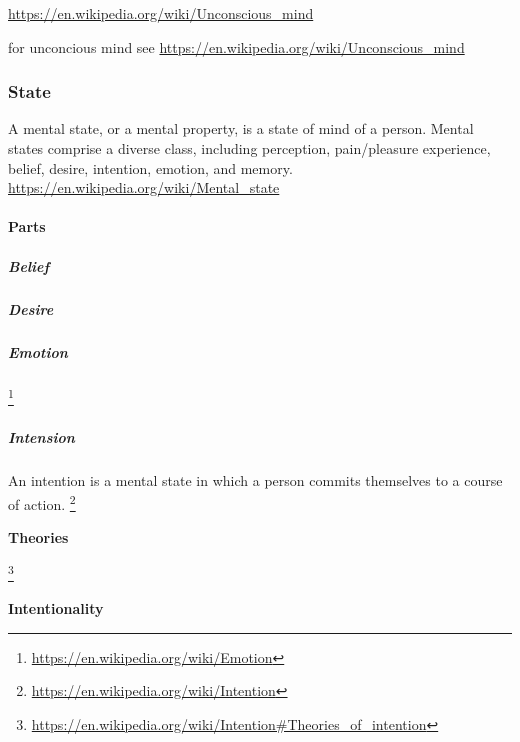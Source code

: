 \documentclass{book}
\providecommand{\ProjectDeepHeading}[2]{%
    \par\medskip\noindent\textbf{#2}\par\smallskip
}
\providecommand{\seeherefooter}[1]{\footnote{\url{#1}}}
\begin{document}
\url{https://en.wikipedia.org/wiki/Unconscious_mind}
    
    for unconcious mind see
    \url{https://en.wikipedia.org/wiki/Unconscious_mind}

\subsubsection{State}


A mental state, or a mental property, is a state of mind of a person. Mental states comprise a diverse class, including perception, pain/pleasure experience, belief, desire, intention, emotion, and memory.
    \url{https://en.wikipedia.org/wiki/Mental_state}
    
    

\paragraph{Parts}

\subparagraph{Belief}


%

\subparagraph{Desire}


%

\subparagraph{Emotion}


\seeherefooter{https://en.wikipedia.org/wiki/Emotion}

\subparagraph{Intension}


An intention is a mental state in which a person commits themselves to a course of action. \seeherefooter{https://en.wikipedia.org/wiki/Intention}
    
    \ProjectDeepHeading{3}{Theories}


\seeherefooter{https://en.wikipedia.org/wiki/Intention\#Theories_of_intention}

\ProjectDeepHeading{1}{Intentionality}

\end{document}
